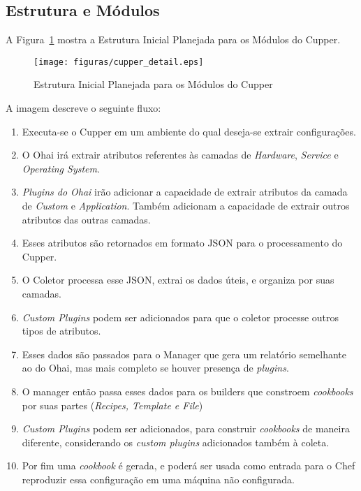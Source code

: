 \subsection{Estrutura e Módulos}

A Figura~\ref{fig:cupper-detail} mostra a Estrutura Inicial Planejada para os 
Módulos do Cupper.

\begin{figure}[H]
  \centering
  \texttt{[image: figuras/cupper\_detail.eps]}
  \caption{Estrutura Inicial Planejada para os Módulos do Cupper}
  \label{fig:cupper-detail}
\end{figure}

A imagem descreve o seguinte fluxo:

\begin{enumerate}
    \item Executa-se o Cupper em um ambiente do qual deseja-se extrair configurações.
    \item O Ohai irá extrair atributos referentes às camadas de \textit{Hardware},
\textit{Service} e \textit{Operating System}.
    \item \textit{Plugins do Ohai} irão adicionar a capacidade de extrair atributos da
camada de \textit{Custom} e \textit{Application}. Também adicionam a capacidade
de extrair outros atributos das outras camadas.
    \item Esses atributos são retornados em formato JSON para o processamento
do Cupper.
    \item O Coletor processa esse JSON, extrai os dados úteis, e organiza
por suas camadas.
    \item \textit{Custom Plugins} podem ser adicionados para que o coletor
processe outros tipos de atributos.
    \item Esses dados são passados para o Manager que gera um relatório semelhante
ao do Ohai, mas mais completo se houver presença de \textit{plugins}.
    \item O manager então passa esses dados para os builders que constroem
\textit{cookbooks} por suas partes (\textit{Recipes, Template e File})
    \item \textit{Custom Plugins} podem ser adicionados, para construir
\textit{cookbooks} de maneira diferente, considerando os \textit{custom plugins}
adicionados também à coleta.
    \item Por fim uma \textit{cookbook} é gerada, e poderá ser usada como 
entrada para o Chef reproduzir essa configuração em uma máquina não
configurada.
\end{enumerate}
